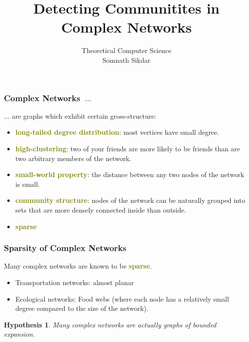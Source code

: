\documentclass[xcolor=table]{beamer}
\title{Detecting Communitites in Complex Networks}
\date{}
\author{ Theoretical Computer Science \\
{\small Somnath Sikdar} \\ 
}
\newtheorem{hypothesis}{Hypothesis}
\begin{document}
\begin{frame}
	\titlepage
\end{frame}



\begin{frame}[t]
\frametitle{Complex Networks~$\ldots$}
$\ldots$ are graphs which exhibit certain gross-structure:
\begin{itemize}
	\item \textcolor{olive}{\bf long-tailed degree distribution}: most vertices have small degree.
	\item \textcolor{olive}{\bf high-clustering}: two of your friends are more likely to be friends than are 
	two arbitrary members of the network.
	\item \textcolor{olive}{\bf small-world property}: the distance between any two nodes of the network is small.
	\item \textcolor{olive}{\bf community structure}: nodes of the network can be naturally grouped into sets 
		that are more densely connected inside than outside.
	\item \textcolor{olive}{\bf sparse} 
\end{itemize}
\end{frame}

\begin{frame}[t]
\frametitle{Sparsity of Complex Networks}
Many complex networks are known to be \textcolor{olive}{\textbf{sparse}}.
\begin{itemize}
	\item Transportation networks: almost planar
	\item Ecological networks: Food webs (where each node has a relatively small degree compared to
		the size of the network).
\end{itemize}

\pause

\begin{hypothesis}
Many complex networks are actually graphs of bounded expansion. 
\end{hypothesis}
\end{frame}
\end{document}
